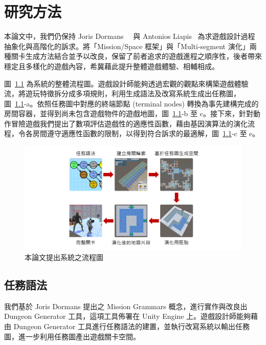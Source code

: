 \chapter{研究方法}
\label{cha:methodology}

本論文中，我們仍保持 Joris Dormans~\cite{dormans2010adventures}~\cite{dormans2012engineering} 與 Antonios Liapis~\cite{liapis2013generating} 為求遊戲設計過程抽象化與高階化的訴求。將「Mission/Space 框架」與「Multi-segment 演化」兩種關卡生成方法結合並予以改良，保留了前者追求的遊戲進程之順序性，後者帶來穩定且多樣化的遊戲內容，希冀藉此提升整體遊戲體驗、相輔相成。

圖~\ref{fig:system-framework} 為系統的整體流程圖。遊戲設計師能夠透過宏觀的觀點來構築遊戲體驗流，將遊玩特徵拆分成多項規則，利用生成語法及改寫系統生成出任務圖，圖~\ref{fig:system-framework}-a。依照任務圖中對應的終端節點 (terminal nodes) 轉換為事先建構完成的房間容器，並得到尚未包含遊戲物件的遊戲地圖，圖~\ref{fig:system-framework}-b 至 c。接下來，針對動作冒險遊戲我們提出了數項評估遊戲性的適應性函數，藉由基因演算法的演化流程，令各房間遵守適應性函數的限制，以得到符合訴求的最適解，圖~\ref{fig:system-framework}-c 至 e。

\begin{figure}[ht]
  \begin{center}
    \includegraphics[width=1.0\textwidth]{figures/系統框架.png}
    \caption{本論文提出系統之流程圖} 
    \label{fig:system-framework}
  \end{center}
\end{figure}

\section{任務語法}
\label{sec:method-missiongrammars}

我們基於 Joris Dormans 提出之 Mission Grammars 概念，進行實作與改良出 Dungeon Generator 工具，這項工具佈署在 Unity Engine 上。遊戲設計師能夠藉由 Dungeon Generator 工具進行任務語法的建置，並執行改寫系統以輸出任務圖，進一步利用任務圖產出遊戲關卡空間。

